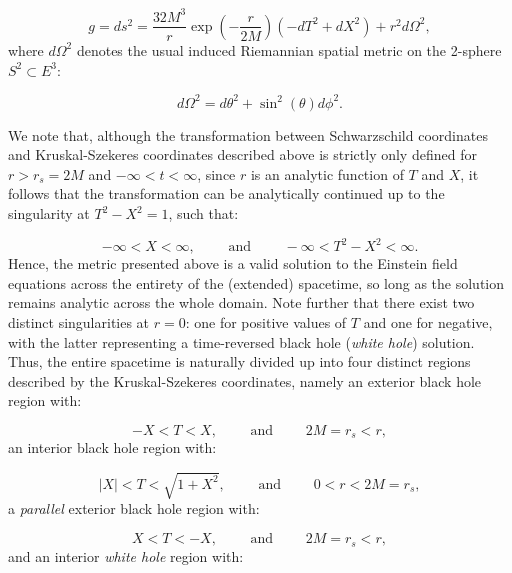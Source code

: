 \documentclass{article}
\begin{document}
\begin{equation}
g = ds^2 = \frac{32 M^3}{r} \exp \left( - \frac{r}{2M} \right) \left( -dT^2 + dX^2 \right) + r^2 d \Omega^2,
\end{equation}
where ${d \Omega^2}$ denotes the usual induced Riemannian spatial metric on the 2-sphere ${S^2 \subset E^3}$:

\begin{equation}
d \Omega^2 = d \theta^2 + \sin^2 \left( \theta \right) d \phi^2.
\end{equation}

We note that, although the transformation between Schwarzschild coordinates and Kruskal-Szekeres coordinates described above is strictly only defined for ${r > r_s = 2M}$ and ${-\infty < t < \infty}$, since $r$ is an analytic function of $T$ and $X$, it follows that the transformation can be analytically continued up to the singularity at ${T^2 - X^2 = 1}$, such that:

\begin{equation}
-\infty < X < \infty, \qquad \text{ and } \qquad -\infty < T^2 - X^2 < \infty.
\end{equation}
Hence, the metric presented above is a valid solution to the Einstein field equations across the entirety of the (extended) spacetime, so long as the solution remains analytic across the whole domain. Note further that there exist two distinct singularities at ${r = 0}$: one for positive values of $T$ and one for negative, with the latter representing a time-reversed black hole (\textit{white hole}) solution. Thus, the entire spacetime is naturally divided up into four distinct regions described by the Kruskal-Szekeres coordinates, namely an exterior black hole region with:

\begin{equation}
-X < T < X, \qquad \text{ and } \qquad 2M = r_s < r,
\end{equation}
an interior black hole region with:

\begin{equation}
\left\lvert X \right\rvert < T < \sqrt{1 + X^2}, \qquad \text{ and } \qquad 0 < r < 2M = r_s,
\end{equation}
a \textit{parallel} exterior black hole region with:

\begin{equation}
X < T < -X, \qquad \text{ and } \qquad 2 M = r_s < r,
\end{equation}
and an interior \textit{white hole} region with:
\end{document}
